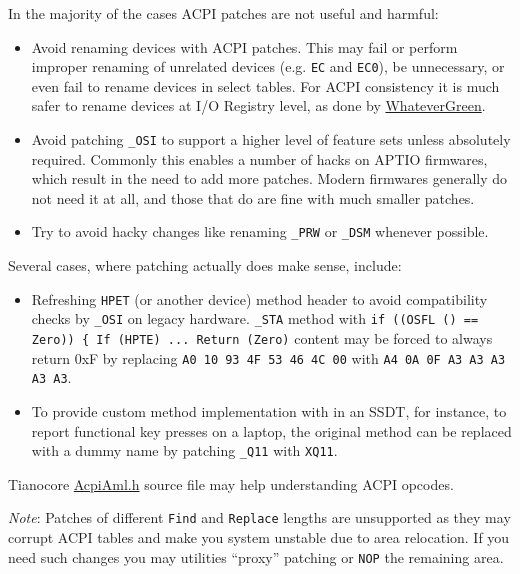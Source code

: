 \documentclass[]{article}
\begin{document}
In the majority of the cases ACPI patches are not useful and harmful:

\begin{itemize}
\item
  Avoid renaming devices with ACPI patches. This may fail or perform
  improper renaming of unrelated devices (e.g. \texttt{EC} and
  \texttt{EC0}), be unnecessary, or even fail to rename devices in select tables. For
  ACPI consistency it is much safer to rename devices at I/O Registry
  level, as done by
  \href{https://github.com/acidanthera/WhateverGreen}{WhateverGreen}.
\item
  Avoid patching \texttt{\_OSI} to support a higher level of feature sets
  unless absolutely required. Commonly this enables a number of hacks on APTIO
  firmwares, which result in the need to add more patches. Modern firmwares
  generally do not need it at all, and those that do are fine with much
  smaller patches.
\item
  Try to avoid hacky changes like renaming \texttt{\_PRW} or \texttt{\_DSM}
  whenever possible.
\end{itemize}

Several cases, where patching actually does make sense, include:

\begin{itemize}
\item
  Refreshing \texttt{HPET} (or another device) method header to avoid
  compatibility checks by \texttt{\_OSI} on legacy hardware. \texttt{\_STA}
  method with \texttt{if ((OSFL () == Zero)) \{ If (HPTE)  ...  Return (Zero)}
  content may be forced to always return 0xF by replacing
  \texttt{A0 10 93 4F 53 46 4C 00} with \texttt{A4 0A 0F A3 A3 A3 A3 A3}.
\item
  To provide custom method implementation with in an SSDT, for instance,
  to report functional key presses on a laptop, the original method can be replaced
  with a dummy name by patching \texttt{\_Q11} with \texttt{XQ11}.
\end{itemize}

Tianocore \href{https://github.com/acidanthera/audk/blob/master/MdePkg/Include/IndustryStandard/AcpiAml.h}{AcpiAml.h}
source file may help understanding ACPI opcodes.

\emph{Note}: Patches of different \texttt{Find} and \texttt{Replace} lengths
are unsupported as they may corrupt ACPI tables and make you system unstable
due to area relocation. If you need such changes you may utilities ``proxy''
patching or \texttt{NOP} the remaining area.
\end{document}
